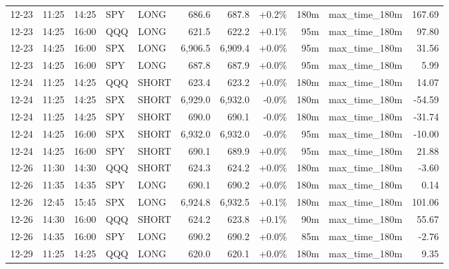\documentclass[11pt,a4paper,twoside]{article}
\begin{document}
\begin{center}
\begin{longtable}{>{\color{txtmain}}l l l l l r r r r >{\color{txtmain}}l r}
12-23 & 11:25 & 14:25 & SPY & LONG & 686.6 & 687.8 & \textcolor{wingreen}{+0.2\%} & 180m & max\_time\_180m & \textcolor{wingreen}{167.69} \\
12-23 & 14:25 & 16:00 & QQQ & LONG & 621.5 & 622.2 & \textcolor{wingreen}{+0.1\%} & 95m & max\_time\_180m & \textcolor{wingreen}{97.80} \\
12-23 & 14:25 & 16:00 & SPX & LONG & 6,906.5 & 6,909.4 & \textcolor{wingreen}{+0.0\%} & 95m & max\_time\_180m & \textcolor{wingreen}{31.56} \\
12-23 & 14:25 & 16:00 & SPY & LONG & 687.8 & 687.9 & \textcolor{wingreen}{+0.0\%} & 95m & max\_time\_180m & \textcolor{wingreen}{5.99} \\
12-24 & 11:25 & 14:25 & QQQ & SHORT & 623.4 & 623.2 & \textcolor{wingreen}{+0.0\%} & 180m & max\_time\_180m & \textcolor{wingreen}{14.07} \\
12-24 & 11:25 & 14:25 & SPX & SHORT & 6,929.0 & 6,932.0 & \textcolor{lossred}{-0.0\%} & 180m & max\_time\_180m & \textcolor{lossred}{-54.59} \\
12-24 & 11:25 & 14:25 & SPY & SHORT & 690.0 & 690.1 & \textcolor{lossred}{-0.0\%} & 180m & max\_time\_180m & \textcolor{lossred}{-31.74} \\
12-24 & 14:25 & 16:00 & SPX & SHORT & 6,932.0 & 6,932.0 & \textcolor{wingreen}{-0.0\%} & 95m & max\_time\_180m & \textcolor{lossred}{-10.00} \\
12-24 & 14:25 & 16:00 & SPY & SHORT & 690.1 & 689.9 & \textcolor{wingreen}{+0.0\%} & 95m & max\_time\_180m & \textcolor{wingreen}{21.88} \\
12-26 & 11:30 & 14:30 & QQQ & SHORT & 624.3 & 624.2 & \textcolor{wingreen}{+0.0\%} & 180m & max\_time\_180m & \textcolor{lossred}{-3.60} \\
12-26 & 11:35 & 14:35 & SPY & LONG & 690.1 & 690.2 & \textcolor{wingreen}{+0.0\%} & 180m & max\_time\_180m & \textcolor{wingreen}{0.14} \\
12-26 & 12:45 & 15:45 & SPX & LONG & 6,924.8 & 6,932.5 & \textcolor{wingreen}{+0.1\%} & 180m & max\_time\_180m & \textcolor{wingreen}{101.06} \\
12-26 & 14:30 & 16:00 & QQQ & SHORT & 624.2 & 623.8 & \textcolor{wingreen}{+0.1\%} & 90m & max\_time\_180m & \textcolor{wingreen}{55.67} \\
12-26 & 14:35 & 16:00 & SPY & LONG & 690.2 & 690.2 & \textcolor{wingreen}{+0.0\%} & 85m & max\_time\_180m & \textcolor{lossred}{-2.76} \\
12-29 & 11:25 & 14:25 & QQQ & LONG & 620.0 & 620.1 & \textcolor{wingreen}{+0.0\%} & 180m & max\_time\_180m & \textcolor{wingreen}{9.35} \\

\end{longtable}
\end{center}
\end{document}
